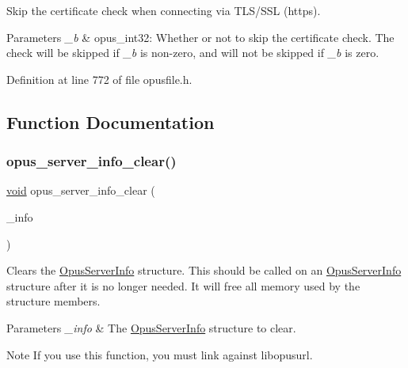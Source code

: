 Skip the certificate check when connecting via T\+L\+S/\+S\+SL (https). 
\begin{DoxyParams}{Parameters}
{\em \+\_\+b} & {\ttfamily opus\+\_\+int32}\+: Whether or not to skip the certificate check. The check will be skipped if {\itshape \+\_\+b} is non-\/zero, and will not be skipped if {\itshape \+\_\+b} is zero. \\
\hline
\end{DoxyParams}


Definition at line 772 of file opusfile.\+h.



\subsection{Function Documentation}
\mbox{\label{group__url__options_ga096536e460277fe890acb265d8fdbd63}} 
\subsubsection{\texorpdfstring{opus\_server\_info\_clear()}{opus\_server\_info\_clear()}}
{\footnotesize\ttfamily \mbox{\hyperlink{_s_d_l__opengles2__gl2ext_8h_ae5d8fa23ad07c48bb609509eae494c95}{void}} opus\+\_\+server\+\_\+info\+\_\+clear (\begin{DoxyParamCaption}\item[{\mbox{\hyperlink{struct_opus_server_info}{Opus\+Server\+Info}} $\ast$}]{\+\_\+info }\end{DoxyParamCaption})}

Clears the \mbox{\hyperlink{struct_opus_server_info}{Opus\+Server\+Info}} structure. This should be called on an \mbox{\hyperlink{struct_opus_server_info}{Opus\+Server\+Info}} structure after it is no longer needed. It will free all memory used by the structure members. 
\begin{DoxyParams}{Parameters}
{\em \+\_\+info} & The \mbox{\hyperlink{struct_opus_server_info}{Opus\+Server\+Info}} structure to clear. \\
\hline
\end{DoxyParams}
\begin{DoxyNote}{Note}
If you use this function, you must link against {\ttfamily libopusurl}. 
\end{DoxyNote}
\mbox{\label{group__url__options_ga8a8c97266e46504e064bba1a70495738}} 
